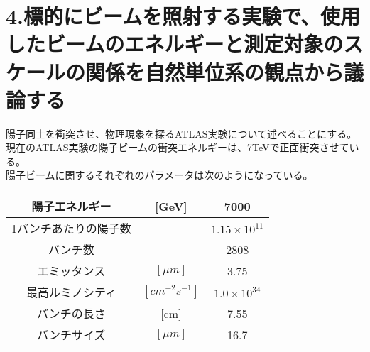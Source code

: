 \documentclass[10pt]{jreport}
\begin{document}
\section*{4.標的にビームを照射する実験で、使用したビームのエネルギーと測定対象のスケールの関係を自然単位系の観点から議論する}
陽子同士を衝突させ、物理現象を探るATLAS実験について述べることにする。現在のATLAS実験の陽子ビームの衝突エネルギーは、7TeVで正面衝突させている。\\
陽子ビームに関するそれぞれのパラメータは次のようになっている。\\
\begin{table}[h]
\centering
\begin{tabular}{|c|c|c|} \hline
	陽子エネルギー & [GeV] & 7000 \\ \hline 
	1バンチあたりの陽子数 & & $1.15× 10^{11}$ \\ 
	バンチ数　& & 2808 \\
	エミッタンス　&$ [\mu m] $ & 3.75 \\
	最高ルミノシティ &$[cm^{-2} s^{-1}]$ & $1.0 \times 10^{34}$ \\
	バンチの長さ & [cm] & 7.55 \\
	バンチサイズ　& $[\mu m]$ &16.7 \\ \hline
\end{tabular}
\end{table}

\newpage
\end{document}
